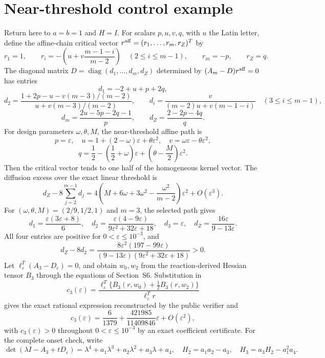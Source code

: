 \documentclass[10pt]{article}
\newcommand{\diag}{\operatorname{diag}}
\newcommand{\1}{\mathbf1}
\begin{document}


\section{Near-threshold control example}

Return here to $a=b=1$ and $H=I$.  For scalars $p,u,v,q$, with $u$ the
Latin letter, define the affine-chain critical vector
$r^{\rm aff}=(r_1,\ldots,r_m,r_Z)^T$ by
\[
 r_1=1,\qquad
 r_i=-\left(u+v\frac{m-1-i}{m-2}\right)
 \quad(2\le i\le m-1),
 \qquad r_m=-p,\qquad r_Z=q.
\]
The diagonal matrix $D=\diag(d_1,\ldots,d_m,d_Z)$ determined by
$(A_m-D)r^{\rm aff}=0$ has entries
\[
 d_1=-2+u+p+2q,
\]
\[
 d_2=
 \frac{1+2p-u-v(m-3)/(m-2)}
 {u+v(m-3)/(m-2)},
 \qquad
 d_i=\frac{v}{(m-2)u+v(m-1-i)}
 \quad(3\le i\le m-1),
\]
\[
 d_m=\frac{2u-5p-2q-1}{p},
 \qquad
 d_Z=\frac{2-2p-4q}{q}.
\]
For design parameters $\omega,\theta,M$, the near-threshold affine path is
\[
p=\varepsilon,\quad
u=1+(2-\omega)\varepsilon+\theta\varepsilon^2,\quad
v=\omega\varepsilon-\theta\varepsilon^2,
\]
\[
q=\frac12-\left(\frac12+\omega\right)\varepsilon
 +\left(\theta-\frac M2\right)\varepsilon^2.
\]
Then the critical vector tends to one half of the homogeneous kernel vector.  The
diffusion excess over the exact linear threshold is
\[
 d_Z-8\sum_{j=2}^{m-1}d_j
 =4\left(M+6\omega+3\omega^2-\frac{\omega^2}{m-2}\right)\varepsilon^2
 +O(\varepsilon^3).
\]
For $(\omega,\theta,M)=(2/9,1/2,1)$ and $m=3$, the selected path gives
\[
 d_1=\frac{\varepsilon(3\varepsilon+8)}6,\quad
 d_2=\frac{\varepsilon(4-9\varepsilon)}
 {9\varepsilon^2+32\varepsilon+18},\quad
 d_3=\varepsilon,\quad d_Z=\frac{16\varepsilon}{9-13\varepsilon}.
\]
All four entries are positive for $0<\varepsilon\le10^{-3}$, and
\[
 d_Z-8d_2=
 \frac{8\varepsilon^2(197-99\varepsilon)}
 {(9-13\varepsilon)(9\varepsilon^2+32\varepsilon+18)}>0.
\]
Let $\ell_\varepsilon^T(A_3-D_\varepsilon)=0$, and obtain $w_0,w_2$
from the reaction-derived Hessian tensor $B_3$ through the equations of
Section~S6.  Substitution in
\[
 c_3(\varepsilon)=
 \frac{\ell_\varepsilon^T\{B_3(r,w_0)+\tfrac12B_3(r,w_2)\}}
 {\ell_\varepsilon^Tr}
\]
gives the exact rational expression reconstructed by the public verifier and
\[
 c_3(\varepsilon)=\frac6{1379}
 +\frac{421985}{11409846}\varepsilon+O(\varepsilon^2),
\]
with $c_3(\varepsilon)>0$ throughout $0<\varepsilon\le10^{-3}$ by an exact
coefficient certificate.  For the complete onset check, write
\[
 \det(\lambda I-A_3+tD_\varepsilon)
 =\lambda^4+a_1\lambda^3+a_2\lambda^2+a_3\lambda+a_4,
 \quad H_2=a_1a_2-a_3,\quad H_3=a_3H_2-a_1^2a_4.
\]
\end{document}
